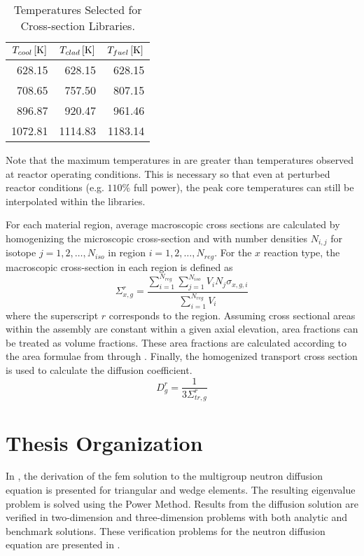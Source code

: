   \begin{table}
    \caption{Temperatures Selected for Cross-section Libraries.}
    \label{tab:xstemps}
    \begin{center}
      \begin{tabular}{rrr}
        \toprule
        $T_{cool} \left[\text{{K}}\right]$ & $T_{clad} \left[\text{{K}}\right]$ & $T_{fuel} \left[\text{{K}}\right]$ \\
        \midrule
        628.15 & 628.15 & 628.15  \\
        708.65 & 757.50 & 807.15  \\
        896.87 & 920.47 & 961.46 \\
        1072.81 & 1114.83 & 1183.14 \\
        \bottomrule
      \end{tabular}
    \end{center}
  \end{table}

  Note that the maximum temperatures in  are greater than 
  temperatures observed at reactor operating conditions. This is necessary so 
  that even at perturbed reactor conditions (e.g. $110\%$ full power), the peak 
  core temperatures can still be interpolated within the libraries.

  For each material region, average macroscopic cross
  sections are calculated by homogenizing the microscopic cross-section and with 
  number densities $N_{i,j}$ for isotope ${j=1,2,\ldots,N_{iso}}$ in region
  ${i=1,2,\ldots,N_{reg}}$.  For the $x$ reaction type, the 
  macroscopic cross-section in each region is defined as
  \begin{equation}
    \Sigma_{x,g}^r = \frac{\sum_{i=1}^{N_{reg}} \sum_{j=1}^{N_{iso}} V_i N_{j} 
      \sigma_{x,g,i}} {\sum_{i=1}^{N_{reg}}V_i}
  \end{equation}
  where the superscript $r$ corresponds to the region. Assuming cross sectional
  areas within the assembly are constant within a given axial elevation, area
  fractions can be treated as volume fractions. These area fractions are
  calculated according to the area formulae from  through
  . Finally, the homogenized transport cross section is used 
  to calculate the diffusion coefficient.
  \begin{equation}
    D_g^r = \frac{1}{3 \Sigma_{tr,g}^r}
  \end{equation}

\section{Thesis Organization}
  In , the derivation of the \gls{fem} solution to the
  multigroup neutron diffusion equation is
  presented for triangular and wedge elements. The resulting eigenvalue problem
  is solved using the Power Method. Results from the diffusion solution are
  verified in two-dimension and three-dimension problems with both analytic and
  benchmark solutions. These verification problems for the neutron diffusion
  equation are presented in .

